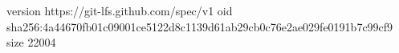 version https://git-lfs.github.com/spec/v1
oid sha256:4a44670fb01c09001ce5122d8c1139d61ab29cb0c76e2ae029fe0191b7c99cf9
size 22004
